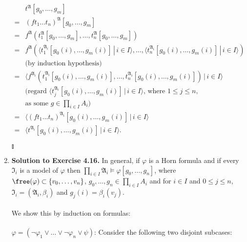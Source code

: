 \begin{enumerate}[1.]
\[
\begin{array}{ll}
\,  & t^{\mathfrak{A}} [g_0, \ldots , g_m] \\
= & (ft_1 \ldots t_n)^{\mathfrak{A}} [g_0, \ldots , g_m] \\
= & f^{\mathfrak{A}} ( t_1^{\mathfrak{A}} [g_0, \ldots , g_m], \ldots , t_n^{\mathfrak{A}} [g_0, \ldots , g_m] ) \\
= & f^{\mathfrak{A}} ( \langle t_1^{\mathfrak{A}_i} [g_0(i), \ldots , g_m(i)] \, | \, i \in I \rangle , \ldots , \langle t_n^{\mathfrak{A}_i} [g_0(i), \ldots , g_m(i)] \, | \, i \in I \rangle ) \\
\,  & \mbox{(by induction hypothesis)} \\
= & \langle f^{\mathfrak{A}_i} ( t_1^{\mathfrak{A}_i} [g_0(i), \ldots , g_m(i)], \ldots , t_n^{\mathfrak{A}_i} [g_0(i), \ldots , g_m(i)] ) \, | \, i \in I \rangle \\
\,  & \mbox{(regard $\langle t_j^{\mathfrak{A}_i} [g_0(i), \ldots , g_m(i)] \, | \, i \in I \rangle$, where $1 \leq j \leq n$,} \\
\,  & \mbox{as some $g \in \prod_{i \in I} A_i$)} \\
= & \langle (ft_1 \ldots t_n)^{\mathfrak{A}_i} [g_0(i), \ldots , g_m(i)] \, | \, i \in I \rangle \\
= & \langle t^{\mathfrak{A}_i} [g_0(i), \ldots , g_m(i)] \, | \, i \in I \rangle .
\end{array}
\] \begin{flushright}$\talloblong$\end{flushright}
%
\item \textbf{Solution to Exercise 4.16.} In general, if $\varphi$ is a Horn formula and if every $\mathfrak{I}_i$ is a model of $\varphi$ then $\prod_{i \in I} \mathfrak{A}_i \models \varphi [g_0, \ldots , g_n]$, where $\free(\varphi) \subset \{ v_0, \ldots , v_n \}$, $g_0, \ldots , g_n \in \prod_{i \in I} A_i$ and for $i \in I$ and $0 \leq j \leq n$, $\mathfrak{I}_i = (\mathfrak{A}_i, \beta_i)$ and $g_j(i) = \beta_i(v_j)$.\\
\ 
\\We show this by induction on formulas:\\
\ 
\\$\varphi = (\neg \varphi_1 \lor \ldots \lor \neg \varphi_n \lor \psi)$: Consider the following two disjoint subcases:

\end{enumerate}
